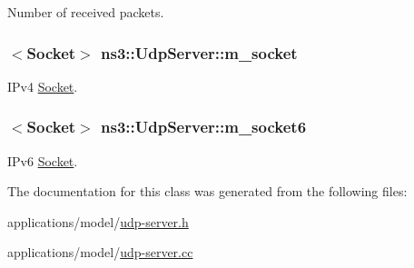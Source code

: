 Number of received packets. 

\subsubsection[{\texorpdfstring{m\+\_\+socket}{m_socket}}]{$<${\bf Socket}$>$ ns3\+::\+Udp\+Server\+::m\+\_\+socket\hspace{0.3cm}{\ttfamily [private]}}\hypertarget{classns3_1_1UdpServer_a5420784fc2d236829a7ccec205fe09fc}{}\label{classns3_1_1UdpServer_a5420784fc2d236829a7ccec205fe09fc}


I\+Pv4 \hyperlink{classns3_1_1Socket}{Socket}. 

\subsubsection[{\texorpdfstring{m\+\_\+socket6}{m_socket6}}]{$<${\bf Socket}$>$ ns3\+::\+Udp\+Server\+::m\+\_\+socket6\hspace{0.3cm}{\ttfamily [private]}}\hypertarget{classns3_1_1UdpServer_a08570b8278b2cf8a0b02a40bbae1dc79}{}\label{classns3_1_1UdpServer_a08570b8278b2cf8a0b02a40bbae1dc79}


I\+Pv6 \hyperlink{classns3_1_1Socket}{Socket}. 



The documentation for this class was generated from the following files\+:\begin{DoxyCompactItemize}
\item 
applications/model/\hyperlink{udp-server_8h}{udp-\/server.\+h}\item 
applications/model/\hyperlink{udp-server_8cc}{udp-\/server.\+cc}\end{DoxyCompactItemize}

